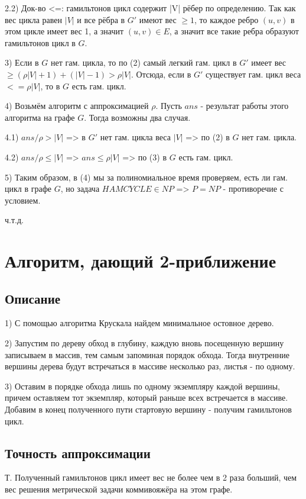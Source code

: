 \documentclass[a4paper,12pt]{article}
\begin{document}
2.2) Док-во <=: гамильтонов цикл содержит |V| рёбер по определению. Так как вес цикла равен $|V|$ и все рёбра в $G'$ имеют вес $\geq 1$, то каждое ребро $(u, v)$ в этом цикле имеет вес 1, а значит $(u ,v) \in E$, а значит все такие ребра образуют гамильтонов цикл в $G$.

3) Если в $G$ нет гам. цикла, то по (2) самый легкий гам. цикл в $G'$ имеет вес $\geq (\rho|V| + 1) + (|V| - 1) > \rho|V|$. Отсюда, если в $G'$ существует гам. цикл веса $ <= \rho|V|$, то в $G$ есть гам. цикл.

4) Возьмём алгоритм с аппроксимацией $\rho$. Пусть $ans$ - результат работы этого алгоритма на графе $G$. Тогда возможны два случая.

4.1) $ans / \rho > |V|$ => в $G'$ нет гам. цикла веса  $|V|$ => по (2) в $G$ нет гам. цикла.

4.2) $ans / \rho \leq |V|$ => $ans \leq \rho|V|$ => по (3) в $G$ есть гам. цикл.

5) Таким образом, в (4) мы за полиномиальное время проверяем, есть ли гам. цикл в графе $G$, но задача $HAMCYCLE \in NP$ => $P = NP$ - противоречие с условием.

ч.т.д.

\section{Алгоритм, дающий 2-приближение}

\subsection{Описание}

1) С помощью алгоритма Крускала найдем минимальное остовное дерево.

2) Запустим по дереву обход в глубину, каждую вновь посещенную вершину записываем в массив, тем самым запоминая порядок обхода. Тогда внутренние вершины дерева будут встречаться в массиве несколько раз, листья - по одному.

3) Оставим в порядке обхода лишь по одному экземпляру каждой вершины, причем оставляем тот экземпляр, который раньше всех встречается в массиве. Добавим в конец полученного пути стартовую вершину - получим гамильтонов цикл.

\subsection{Точность аппроксимации}

Т. Полученный гамильтонов цикл имеет вес не более чем в 2 раза больший, чем вес решения метрической задачи коммивояжёра на этом графе.
\end{document}
